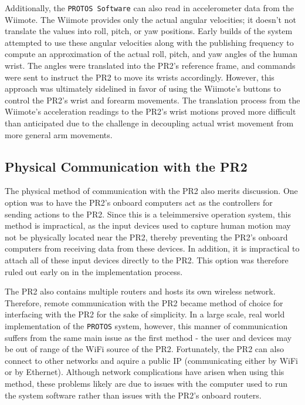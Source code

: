 \documentclass{sig-alternate}
\begin{document}
\indent Additionally,  the {\tt PROTOS Software} can also read in accelerometer data from the Wiimote. The Wiimote
provides only the actual angular velocities; it doesn't not translate the 
values into roll, pitch, or yaw positions. Early builds of the system attempted to use these angular velocities along 
with the publishing frequency to compute an approximation of the actual roll, pitch,
and yaw angles of the human wrist. The angles were translated into the PR2's
reference frame, and commands were sent to instruct the PR2 to move its wrists accordingly. However,
this approach was ultimately sidelined in favor of using the Wiimote's buttons to control the PR2's
wrist and forearm movements. The translation process from the Wiimote's acceleration readings to the PR2's
wrist motions proved more difficult than anticipated due to the challenge in decoupling actual wrist movement
from more general arm movements.

\subsection{Physical Communication with the PR2}
\indent The physical method of
communication with the PR2 also merits discussion. One option was to have the PR2's onboard computers
act as the controllers for sending actions to the PR2. Since this is a teleimmersive operation system, this method is impractical, 
as the input devices used to capture human motion may not be physically located
near the PR2, thereby preventing the PR2's onboard computers from receiving data from these devices. 
In addition, it is impractical to attach all of these input devices 
directly to the PR2. This option was therefore ruled out early on in the implementation process. 

\indent The PR2 also contains multiple routers and hosts its
own wireless network. Therefore, remote communication with the PR2 became method of choice for interfacing
with the PR2 for the sake of simplicity. In a large scale, real world implementation of the {\tt PROTOS} system, however,
this manner of communication suffers from the same main issue as the first method - the user and devices
may be out of range of the WiFi source of the PR2. Fortunately,
the PR2 can also connect to other networks and aquire a public IP
(communicating either by WiFi or by
Ethernet). Although network complications have arisen when using this method,
these problems likely are due to issues with the computer used to run the system software 
rather than issues with the PR2's onboard routers.
\end{document}
